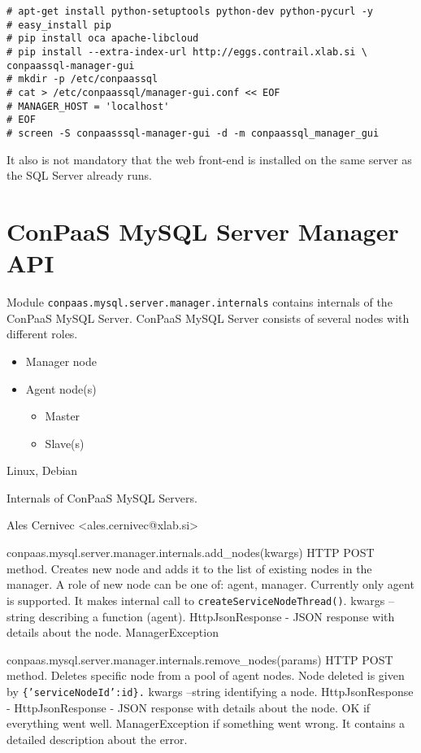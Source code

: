 \documentclass[a4paper,10pt]{article}
\begin{document}
\begin{Verbatim}[frame=single]
# apt-get install python-setuptools python-dev python-pycurl -y
# easy_install pip
# pip install oca apache-libcloud
# pip install --extra-index-url http://eggs.contrail.xlab.si \
conpaassql-manager-gui
# mkdir -p /etc/conpaassql
# cat > /etc/conpaassql/manager-gui.conf << EOF
# MANAGER_HOST = 'localhost'
# EOF
# screen -S conpaasssql-manager-gui -d -m conpaassql_manager_gui
\end{Verbatim}

It also is not mandatory that the web front-end is installed on the same server as the SQL Server already runs. 

\section{ConPaaS MySQL Server Manager API}

Module {\tt conpaas.mysql.server.manager.internals} contains internals of the ConPaaS MySQL Server. ConPaaS MySQL Server consists of several nodes with different roles.

\begin{itemize}
	\item Manager node
	\item Agent node(s)
	\begin{itemize}
		\item Master
		\item Slave(s)
	\end{itemize}	
\end{itemize}

Linux, Debian

Internals of ConPaaS MySQL Servers.

Ales Cernivec <ales.cernivec@xlab.si>
      
\vspace{10pt}

\noindent\conapi
{conpaas.mysql.server.manager.internals.add\_nodes(kwargs)}
{HTTP POST method. Creates new node and adds it to the list of existing nodes in the manager. A role of new node can be one of: agent, manager. Currently only agent is supported. It makes internal call to {\tt createServiceNodeThread()}.}
{kwargs -- string describing a function (agent).}
{HttpJsonResponse - JSON response with details about the node.}
{ManagerException}

\noindent\conapi
{ conpaas.mysql.server.manager.internals.remove\_nodes(params)}
{HTTP POST method. Deletes specific node from a pool of agent nodes. Node deleted is given by {\tt \{'serviceNodeId':id\}.}}
{kwargs --string identifying a node.}
{HttpJsonResponse - HttpJsonResponse - JSON response with details about the node. OK if everything went well. }
{ManagerException if something went wrong. It contains a detailed description about the error.}
\end{document}
